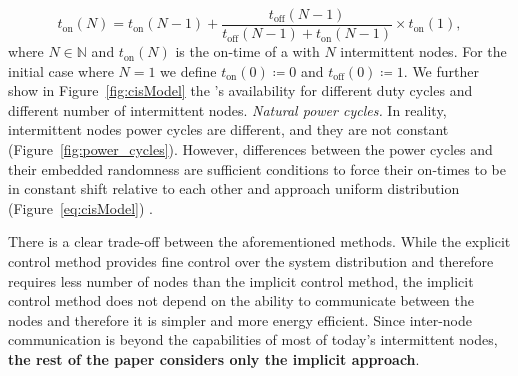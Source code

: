 \begin{equation}
	t_\text{on}(N) = t_\text{on}(N-1) + \frac{t_\text{off}(N-1)}{t_\text{off}(N-1)+t_\text{on}(N-1)} \times t_\text{on}(1),
		\label{eq:cisModel}
\end{equation}
where $N \in \mathbb{N}$ and  $t_\text{on}(N)$ is the on-time of a \sys with $N$ intermittent nodes. For the initial case where $N=1$ we define $t_\text{on}(0)\coloneqq 0$ and $t_\text{off}(0) \coloneqq 1$. We further show in Figure~\ref{fig:cisModel} the \sys's availability for different duty cycles and different number of intermittent nodes.
\noindent\textit{Natural power cycles.}
In reality, intermittent nodes power cycles are different, and they are not constant (Figure~\ref{fig:power_cycles}). However, differences between the power cycles and their embedded randomness are sufficient conditions to force their on-times to be in constant shift relative to each other and approach uniform distribution (Figure~\ref{eq:cisModel})
. 

There is a clear trade-off between the aforementioned methods. While the explicit control method provides fine control over the system 
distribution and therefore requires less number of nodes than the implicit control method, the implicit control method does not depend on the ability to communicate between the nodes and therefore it is simpler and more energy efficient. Since inter-node communication is beyond the capabilities of most of today's intermittent nodes, \textbf{the rest of the paper considers only the implicit approach}.
 

